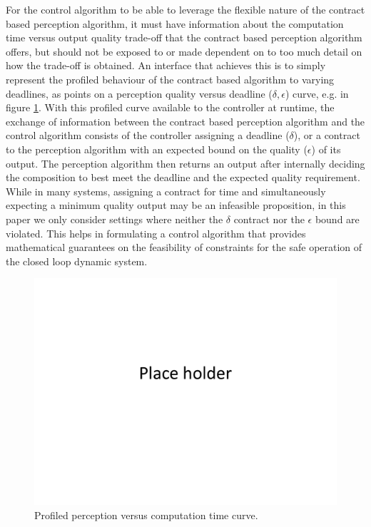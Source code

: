 For the control algorithm to be able to leverage the flexible nature of the contract based perception algorithm, it must have information about the computation time versus output quality trade-off that the contract based perception algorithm offers, but should not be exposed to or made dependent on to too much detail on how the trade-off is obtained. An interface that achieves this is to simply represent the profiled behaviour of the contract based algorithm to varying deadlines, as points on a perception quality versus deadline ($\delta, \epsilon$) curve, e.g. in figure \ref{fig:eps_delta_toy}.
With this profiled curve available to the controller at runtime, the exchange of information between the contract based perception algorithm and the control algorithm consists of the controller assigning a deadline ($\delta$), or a contract to the perception algorithm with an expected bound on the quality ($\epsilon$) of its output. The perception algorithm then returns an output after internally deciding the composition to best meet the deadline and the expected quality requirement. While in many systems, assigning a contract for time and simultaneously expecting a minimum quality output may be an infeasible proposition, in this paper we only consider settings where neither the $\delta$ contract nor the $\epsilon$ bound are violated. This helps in formulating a control algorithm that provides mathematical guarantees on the feasibility of constraints for the safe operation of the closed loop dynamic system.

\begin{figure}[t]
	\centering
	\includegraphics[width=0.9\columnwidth]{figures/placeHolder}
	\caption{Profiled perception versus computation time curve.}
	\label{fig:eps_delta_toy}
\end{figure}

